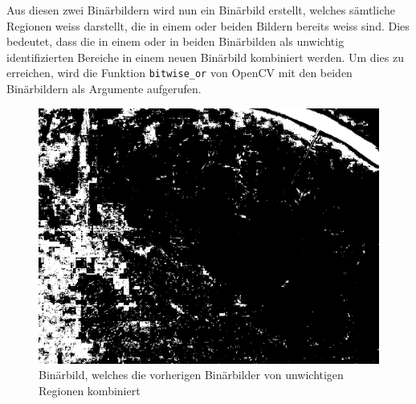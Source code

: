 Aus diesen zwei Binärbildern wird nun ein Binärbild erstellt, welches sämtliche Regionen weiss darstellt, die in einem oder beiden Bildern bereits weiss sind. Dies bedeutet, dass die in einem oder in beiden Binärbilden als unwichtig identifizierten Bereiche in einem neuen Binärbild kombiniert werden. Um dies zu erreichen, wird die Funktion \texttt{bitwise_or} von OpenCV mit den beiden Binärbildern als Argumente aufgerufen. 

\begin{figure}[H]
	\center
	\includegraphics[scale=0.43]{Grafiken/entwicklung/5binLampeUndHolz.jpg}
	\caption{Binärbild, welches die vorherigen Binärbilder von unwichtigen Regionen kombiniert} 
	\label{fig: Binärbild, die vorherigen Binärbilder kombiniert}
\end{figure}

